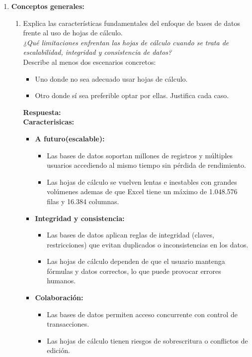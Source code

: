 \documentclass[12pt]{report}
\begin{document}
\begin{enumerate}[label=\textbf{\arabic*.}, leftmargin=*]

\item \textbf{Conceptos generales:}

\begin{enumerate}[label=\textbf{\alph*.}, leftmargin=*, itemsep=1.0em]

\item Explica las caracter\'isticas fundamentales del enfoque de bases de datos frente al uso de hojas de c\'alculo. \\
\textit{¿Qu\'e limitaciones enfrentan las hojas de c\'alculo cuando se trata de escalabilidad, integridad y consistencia de datos?} \\
Describe al menos dos escenarios concretos:
\begin{itemize}
  \item Uno donde no sea adecuado usar hojas de c\'alculo.
  \item Otro donde s\'i sea preferible optar por ellas. Justifica cada caso.
\end{itemize}

    \textbf{Respuesta:}\\
\textbf{Caracterisicas:}
\begin{itemize}
    \item \textbf{A futuro(escalable):} 
    \begin{itemize}
        \item Las bases de datos soportan millones de registros y múltiples usuarios accediendo al mismo tiempo sin pérdida de rendimiento.
        \item Las hojas de cálculo se vuelven lentas e inestables con grandes volúmenes ademas de que Excel tiene un máximo de 1.048.576 filas y 16.384 columnas.
    \end{itemize}
    
    \item \textbf{Integridad y consistencia:} 
    \begin{itemize}
        \item Las bases de datos aplican reglas de integridad (claves, restricciones) que evitan duplicados o inconsistencias en los datos.
        \item Las hojas de cálculo dependen de que el usuario mantenga fórmulas y datos correctos, lo que puede provocar errores humanos.
    \end{itemize}

    \item \textbf{Colaboración:}
    \begin{itemize}
        \item Las bases de datos permiten acceso concurrente con control de transacciones.
        \item Las hojas de cálculo tienen riesgos de sobrescritura o conflictos de edición.
    \end{itemize}


\end{itemize}
\end{enumerate}
\end{enumerate}
\end{document}
